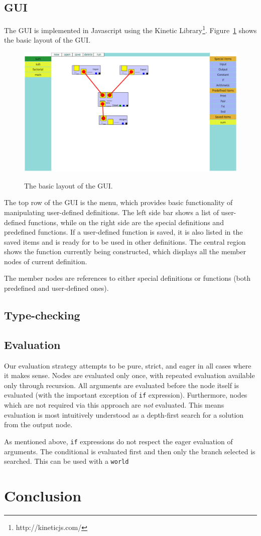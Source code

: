 \documentclass[12pt,UTF8,a4]{article}
\newcommand{\code}[1]{\texttt{#1}}
\begin{document}
\subsection{GUI}
The GUI is implemented in Javascript using the Kinetic Library\footnote{http://kineticjs.com/}. Figure~\ref{fig:gui} shows the basic layout of the GUI.
\begin{figure}[h]
\center
\includegraphics[width=.95\textwidth]{./images/gui.png} \\
\caption{The basic layout of the GUI.}\label{fig:gui}
\end{figure}
The top row of the GUI is the menu, which provides basic functionality of manipulating user-defined definitions. The left side bar shows a list of user-defined functions, while on the right side are the special definitions and predefined functions. If a user-defined function is saved, it is also listed in the saved items and is ready for to be used in other definitions. The central region shows the function currently being constructed, which displays all the member nodes of current definition.

The member nodes are references to either special definitions or functions (both predefined and user-defined ones). 

\subsection{Type-checking}
\subsection{Evaluation}
Our evaluation strategy attempts to be pure, strict, and eager in all cases where it makes sense. Nodes are evaluated only once, with repeated evaluation available only through recursion. All arguments are evaluated before the node itself is evaluated (with the important exception of \code{if} expression). Furthermore, nodes which are not required via this approach are {\em not} evaluated. This means evaluation is most intuitively understood as a depth-first search for a solution from the output node.

As mentioned above, \code{if} expressions do not respect the eager evaluation of arguments. The conditional is evaluated first and then only the branch selected is searched. This can be used with a \code{world}

\section{Conclusion}
\end{document}
